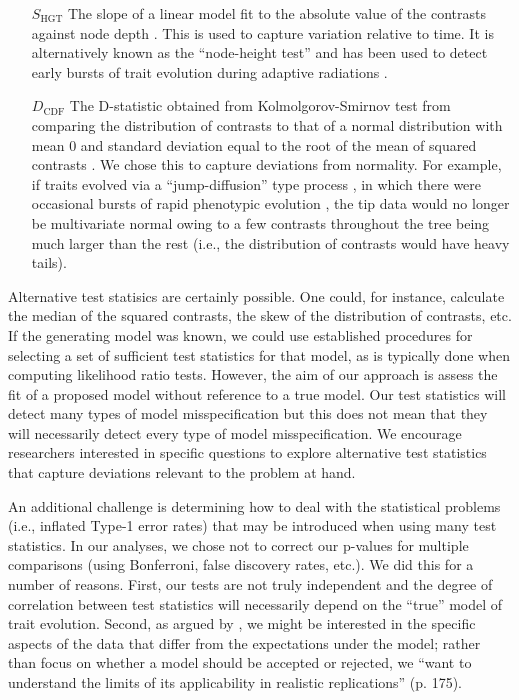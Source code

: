 \begin{enumerate}
\item[$S_{\text{HGT}}$] The slope of a linear model fit to the absolute value of the contrasts against node depth \citep[after][]{Purvis1995}. This is used to capture variation relative to time. It is alternatively known as the ``node-height test'' and has been used to detect early bursts of trait evolution during adaptive radiations \citep[see][for uses and modifications of this test]{FreckletonHarvey2006, SlaterPennell}. 

\item[$D_{\text{CDF}}$] The D-statistic obtained from Kolmolgorov-Smirnov test from comparing the distribution of contrasts to that of a normal distribution with mean $0$ and standard deviation equal to the root of the mean of squared contrasts \citep[the expected distribution of the contrasts under BM; see][]{Felsenstein1985, Rohlf2001}. We chose this to capture deviations from normality. For example, if traits evolved via a ``jump-diffusion'' type process \citep{Landis2012}, in which there were occasional bursts of rapid phenotypic evolution \citep{PennellPE}, the tip data would no longer be multivariate normal owing to a few contrasts throughout the tree being much larger than the rest (i.e., the distribution of contrasts would have heavy tails). 

\end{enumerate}

Alternative test statisics are certainly possible. One could, for instance, calculate the median of the squared contrasts, the skew of the distribution of contrasts, etc. If the generating model was known, we could use established procedures for selecting a set of sufficient \citep[or, approximately sufficient;][]{MajoramJoyce} test statistics for that model, as is typically done when computing likelihood ratio tests. However, the aim of our approach is assess the fit of a proposed model without reference to a true model. Our test statistics will detect many types of model misspecification but this does not mean that they will necessarily detect every type of model misspecification. We encourage researchers interested in specific questions to explore alternative test statistics that capture deviations relevant to the problem at hand. 

An additional challenge is determining how to deal with the statistical problems (i.e., inflated Type-1 error rates) that may be introduced when using many test statistics. In our analyses, we chose not to correct our p-values for multiple comparisons (using Bonferroni, false discovery rates, etc.). We did this for a number of reasons. First, our tests are not truly independent and the degree of correlation between test statistics will necessarily depend on the ``true'' model of trait evolution.  Second, as argued by \citet{Gelman2006}, we might be interested in the specific aspects of the data that differ from the expectations under the model; rather than focus on whether a model should be accepted or rejected, we ``want to understand the limits of its applicability in realistic replications'' (p. 175). 

